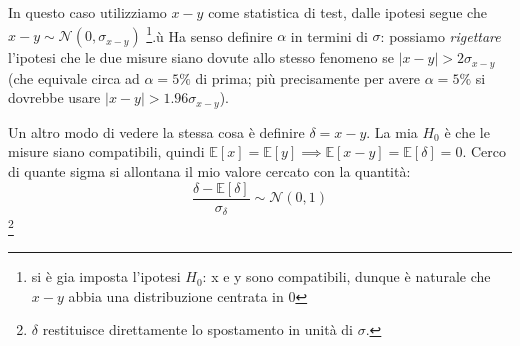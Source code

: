\documentclass[openany,a4paper,12pt]{book}
\theoremstyle{remark}
\begin{document}
In questo caso utilizziamo $x-y$ come statistica di test, dalle ipotesi segue che $x-y \sim \mathcal{N}(0, \sigma_{x-y})$ 
\footnote{si è gia imposta l'ipotesi $H_0$: x e y sono compatibili, dunque è naturale che $x-y$ abbia una distribuzione centrata in 0}.ù
Ha senso definire $\alpha$ in termini di $\sigma$: possiamo \textit{rigettare} l'ipotesi che le due misure siano dovute allo stesso fenomeno se $|x-y| > 2\sigma_{x-y}$ (che equivale circa ad $\alpha=5\%$ di prima; più precisamente per avere $\alpha=5\%$ si dovrebbe usare $|x-y| > 1.96\sigma_{x-y}$).

\begin{center}
\end{center}

Un altro modo di vedere la stessa cosa è definire $\delta = x-y$. La mia $H_0$ è che le misure siano compatibili, quindi $\mathbb{E}[x] = \mathbb{E}[y] \implies \mathbb{E}[x-y] = \mathbb{E}[\delta] = 0$. 
Cerco di quante sigma si allontana il mio valore cercato con la quantità:
\begin{equation}
    \frac{\delta - \mathbb{E}[\delta]}{\sigma_\delta} \sim \mathcal{N}(0,1)
\end{equation}\footnote{$\delta$ restituisce direttamente lo spostamento in unità di $\sigma$.}
\end{document}

